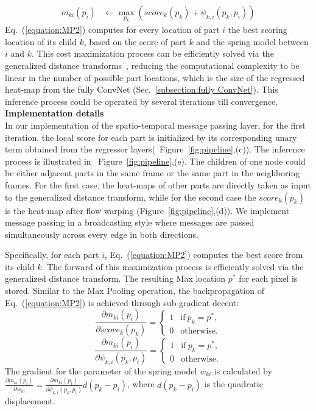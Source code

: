 \documentclass[10pt,twocolumn,letterpaper]{article}
\newcommand{\figref}[1]{Figure~\ref{#1}}
\newcommand{\secref}[1]{Sec.~\ref{#1}}
\newcommand{\refequ}[1]{Eq.~(\ref{#1})}
\begin{document}
\begin{equation}
\begin{aligned}
m_{ki}(p_i) &\leftarrow \max_{p_k}(score_k(p_k)+\psi_{k,i}(p_k, p_i))
\end{aligned}
\label{equation:MP2}
\end{equation}\refequ{equation:MP2} computes for every location of part $i$ the best scoring location of its child $k$, based on the score of part $k$ and the spring model between $i$ and $k$. This cost maximization process can be efficiently solved via the generalized distance transforms~\cite{felzenszwalb2004distance}, reducing the computational complexity to be linear in the number of possible part locations, which is the size of the regressed heat-map from the fully ConvNet (\secref{subsection:fully ConvNet}). This inference process could be operated by several iterations till convergence. \\

\noindent\textbf{Implementation details}\\
In our implementation of the spatio-temporal message passing layer, for the first iteration, the local score for each part is initialized by its corresponding unary term obtained from the regressor layers(~\figref{fig:pipeline},(c)). The inference process is illustrated in ~\figref{fig:pipeline},(e). The children of one node could be either adjacent parts in the same frame or the same part in the neighboring frames. For the first case, the heat-maps of other parts are directly taken as input to the generalized distance transform, while for the second case the $score_k(p_k)$ is the heat-map after flow warping (\figref{fig:pipeline},(d)).
We implement message passing in a broadcasting style where messages are passed simultaneously across every edge in both directions.

Specifically, for each part $i$, \refequ{equation:MP2} computes the best score from its child $k$. The forward of this maximization process is efficiently solved via the generalized distance transform. The resulting Max location $p^*$ for each pixel is stored. Similar to the Max Pooling operation, the backpropagation of \refequ{equation:MP2} is achieved through sub-gradient decent:
\begin{displaymath}
\frac{\partial m_{ki}(p_i)}{\partial score_k(p_k)} = \left\{ \begin{array}{cc}
1 & \mathrm{if} \ p_k = p^*, \\
0 & \mathrm{otherwise}.
\end{array}
\right.
\end{displaymath}\begin{displaymath}
\frac{\partial m_{ki}(p_i)}{\partial \psi_{k,i}(p_k, p_i)} = \left\{ \begin{array}{cc}
1 & \mathrm{if} \ p_k = p^*, \\
0 & \mathrm{otherwise}.
\end{array}
\right.
\end{displaymath}
The gradient for the parameter of the spring model $w_{ki}$ is calculated by $\frac{\partial m_{ki}(p_i)}{\partial w_{ki}} = \frac{\partial m_{ki}(p_i)}{\partial \psi_{k,i}(p_k, p_i)}d(p_k-p_i)$, where $d(p_k-p_i)$ is the quadratic displacement.
\end{document}

